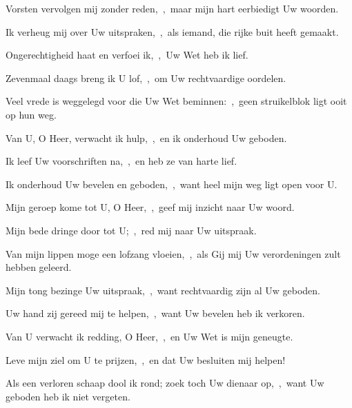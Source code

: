 \documentclass[12pt,twoside,a5paper]{article}
\begin{document}
\begin{halfparskip}
   Vorsten vervolgen mij zonder reden,~\sep\ maar mijn hart eerbiedigt Uw woorden.


  Ik verheug mij over Uw uitspraken,~\sep\ als iemand, die rijke buit heeft gemaakt.

  Ongerechtigheid haat en verfoei ik,~\sep\ Uw Wet heb ik lief.

  Zevenmaal daags breng ik U lof,~\sep\ om Uw rechtvaardige oordelen.

  Veel vrede is weggelegd voor die Uw Wet beminnen:~\sep\ geen struikelblok ligt ooit op hun weg.

  Van U, O Heer, verwacht ik hulp,~\sep\ en ik onderhoud Uw geboden.

  Ik leef Uw voorschriften na,~\sep\ en heb ze van harte lief.

  Ik onderhoud Uw bevelen en geboden,~\sep\ want heel mijn weg ligt open voor U.
\end{halfparskip}

\begin{halfparskip}
   Mijn geroep kome tot U, O Heer,~\sep\ geef mij inzicht naar Uw woord.


  Mijn bede dringe door tot U;~\sep\ red mij naar Uw uitspraak.

  Van mijn lippen moge een lofzang vloeien,~\sep\ als Gij mij Uw verordeningen zult hebben geleerd.

  Mijn tong bezinge Uw uitspraak,~\sep\ want rechtvaardig zijn al Uw geboden.

  Uw hand zij gereed mij te helpen,~\sep\ want Uw bevelen heb ik verkoren.

  Van U verwacht ik redding, O Heer,~\sep\ en Uw Wet is mijn geneugte.

  Leve mijn ziel om U te prijzen,~\sep\ en dat Uw besluiten mij helpen!

  Als een verloren schaap dool ik rond; zoek toch Uw dienaar op,~\sep\ want Uw geboden heb ik niet vergeten.
\end{halfparskip}

\end{document}
